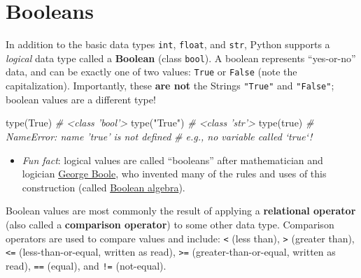 \documentclass[]{book}
\newenvironment{Shaded}{\begin{snugshade}}{\end{snugshade}}
\newcommand{\StringTok}[1]{\textcolor[rgb]{0.31,0.60,0.02}{#1}}
\newcommand{\CommentTok}[1]{\textcolor[rgb]{0.56,0.35,0.01}{\textit{#1}}}
\newcommand{\VariableTok}[1]{\textcolor[rgb]{0.00,0.00,0.00}{#1}}
\newcommand{\BuiltInTok}[1]{#1}
\newcommand{\NormalTok}[1]{#1}
\providecommand{\tightlist}{%
  \setlength{\itemsep}{0pt}\setlength{\parskip}{0pt}}
\begin{document}
\hypertarget{booleans}{\section{Booleans}\label{booleans}}

In addition to the basic data types \texttt{int}, \texttt{float}, and
\texttt{str}, Python supports a \emph{logical} data type called a
\textbf{Boolean} (class \texttt{bool}). A boolean represents
``yes-or-no'' data, and can be exactly one of two values: \texttt{True}
or \texttt{False} (note the capitalization). Importantly, these
\textbf{are not} the Strings \texttt{"True"} and \texttt{"False"};
boolean values are a different type!

\begin{Shaded}
\begin{Highlighting}[]
\BuiltInTok{type}\NormalTok{(}\VariableTok{True}\NormalTok{)    }\CommentTok{# <class 'bool'>}
\BuiltInTok{type}\NormalTok{(}\StringTok{"True"}\NormalTok{)  }\CommentTok{# <class 'str'>}
\BuiltInTok{type}\NormalTok{(true)    }\CommentTok{# NameError: name 'true' is not defined}
              \CommentTok{# e.g., no variable called `true`!}
\end{Highlighting}
\end{Shaded}

\begin{itemize}
\tightlist
\item
  \emph{Fun fact}: logical values are called ``booleans'' after
  mathematician and logician
  \href{https://en.wikipedia.org/wiki/George_Boole}{George Boole}, who
  invented many of the rules and uses of this construction (called
  \href{https://en.wikipedia.org/wiki/Boolean_algebra}{Boolean
  algebra}).
\end{itemize}

Boolean values are most commonly the result of applying a
\textbf{relational operator} (also called a \textbf{comparison
operator}) to some other data type. Comparison operators are used to
compare values and include: \texttt{\textless{}} (less than),
\texttt{\textgreater{}} (greater than), \texttt{\textless{}=}
(less-than-or-equal, written as read), \texttt{\textgreater{}=}
(greater-than-or-equal, written as read), \texttt{==} (equal), and
\texttt{!=} (not-equal).
\end{document}
